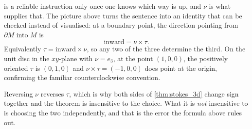 \begin{center}
\end{center}

\begin{remark}
\label{rem:right_hand_rule_as_cross_product}
 is a reliable instruction only once one knows which way is up, and $\nu$ is what
supplies that. The picture above turns the sentence into an identity that can be checked instead
of visualised: at a boundary point, the direction pointing from $\partial M$ into $M$ is
\[\text{inward} = \nu\times\tau.\]
Equivalently $\tau = \text{inward}\times\nu$, so any two of the three determine the third. On the
unit disc in the $xy$-plane with $\nu = e_3$, at the point $(1,0,0)$, the positively oriented
$\tau$ is $(0,1,0)$ and $\nu\times\tau = (-1,0,0)$ does point at the origin, confirming the
familiar counterclockwise convention.

Reversing $\nu$ reverses $\tau$, which is why both sides of \cref{thm:stokes_3d} change sign
together and the theorem is insensitive to the choice. What it is \emph{not} insensitive to is
choosing the two independently, and that is the error the formula above rules out.
\end{remark}

